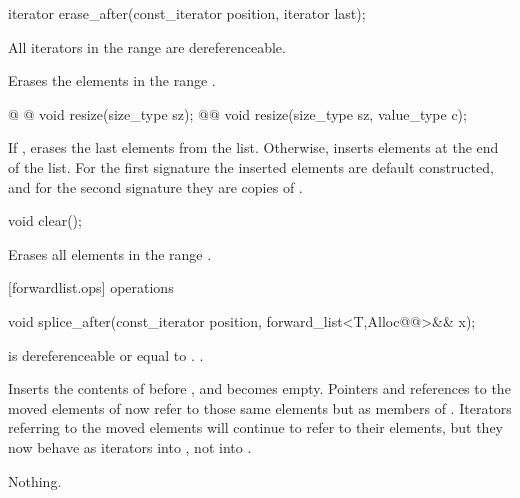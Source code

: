 \documentclass[american,twoside]{book}
\begin{document}
\begin{itemdecl}
iterator erase_after(const_iterator position, iterator last);
\end{itemdecl}

\begin{itemdescr}
\pnum
\requires All iterators in the range  are dereferenceable.

\pnum
\effects Erases the elements in the range .

\pnum
\returns {}
\end{itemdescr}

\begin{itemdecl}
@ @ void resize(size_type sz);
@@ void resize(size_type sz, value_type c);
\end{itemdecl}

\begin{itemdescr}
\pnum
\effects If , erases the last  elements from the list. Otherwise, inserts  elements at the end of the list. For the first signature the inserted elements are default constructed, and for the second signature they are copies of .
\end{itemdescr}

\begin{itemdecl}
void clear();
\end{itemdecl}

\begin{itemdescr}
\pnum
\effects Erases all elements in the range .
\end{itemdescr}

[forwardlist.ops]{ operations}

\begin{itemdecl}
void splice_after(const_iterator position, forward_list<T,Alloc@@>&& x);
\end{itemdecl}

\begin{itemdescr}
\pnum
\requires {} is dereferenceable or equal to . .

\pnum
\effects Inserts the contents of  before , and  becomes empty. Pointers and references to the moved elements of  now refer to those same elements but as members of . Iterators referring to the moved elements will continue to refer to their elements, but they now behave as iterators into , not into .

\pnum
\throws Nothing.

\pnum
\complexity {}
\end{itemdescr}
\end{document}
